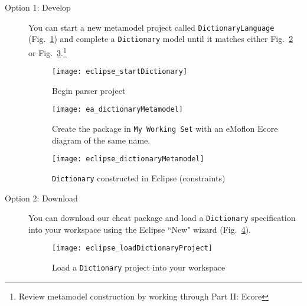 \begin{description}

\item[Option 1: Develop] You can start a new metamodel project called \texttt{Dict\-ion\-aryLanguage} (Fig.~\ref{eclipse:startMetamodel}) and complete a
\texttt{Dictionary} model until it matches either Fig.~\ref{ea:dictLang} or Fig.~\ref{eclipse:dictLang}.\footnote{Review metamodel construction by
working through Part II: Ecore}

\begin{figure}[htbp]
\begin{center}
  \texttt{[image: eclipse\_startDictionary]}
  \caption{Begin parser project}
  \label{eclipse:startMetamodel}
\end{center}
\end{figure}

\newpage %

\vspace*{1cm}

\begin{figure}[htb]
\begin{center}
  \texttt{[image: ea\_dictionaryMetamodel]}
  \caption{Create the package in \texttt{My Working Set} with an eMoflon Ecore diagram of the same name.}
  \label{ea:dictLang}
\end{center}
\end{figure}

\vspace{1cm}

\begin{figure}[htb]
\begin{center}
  \texttt{[image: eclipse\_dictionaryMetamodel]}
  \caption{\texttt{Dictionary} constructed in Eclipse \update (constraints)}
  \label{eclipse:dictLang}
\end{center}
\end{figure}

\newpage %

\item[Option 2: Download] You can download our cheat package and load a \texttt{Dictionary} specification into your workspace using
the Eclipse ``New" wizard (Fig.~\ref{eclipse_cheatPackage}).

\vspace{0.5cm}

\begin{figure}[htbp]
\begin{center}
  \texttt{[image: eclipse\_loadDictionaryProject]}
  \caption{Load a \texttt{Dictionary} project into your workspace}
  \label{eclipse_cheatPackage}
\end{center}
\end{figure}


\end{description}
